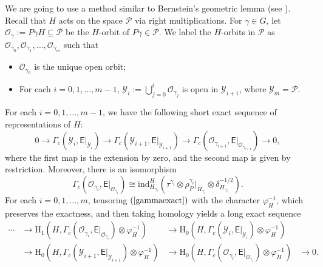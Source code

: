\documentclass[12pt]{amsart}
\newcommand{\CP}{{\mathcal {P}}}
\newcommand{\RH}{{\mathrm {H}}}
\theoremstyle{Theorem}
\theoremstyle{Theorem}
\theoremstyle{Theorem}
\theoremstyle{Theorem}
\theoremstyle{Plain}
\theoremstyle{remark}
\theoremstyle{remark}
\theoremstyle{Definition}
\begin{document}
We are going to use a method similar to Bernstein's geometric lemma (see \cite{B-Z}). Recall that $H$ acts on the space $\mathcal{P}$ via right multiplications. For $\gamma\in G$, let $ \mathcal{O}_\gamma := P \gamma H \subseteq \CP $ be the $H$-orbit of $ P \gamma \in \CP$.  We label the $H$-orbits in $\mathcal{P}$ as $ \mathcal{O}_{ \gamma_0 }, \mathcal{O}_{ \gamma_1 }, \dots, \mathcal{O}_{ \gamma_m } $ such that
\begin{itemize}
    \item $ \mathcal{O}_{\gamma_0} $ is the unique open orbit;
    \item For each $ i = 0, 1, \dots, m - 1 $, $\mathcal{Y}_i := \bigcup_{j=0}^i \mathcal{O}_{ \gamma_j } $ is open in $ \mathcal{Y}_{i+1} $, where $ \mathcal{Y}_m = \mathcal{P} $.
\end{itemize}
For each $ i = 0, 1, \dots, m - 1 $, we have the following short exact sequence of representations of $H$:
\begin{equation}
    \label{gammaexact}
    0 \rightarrow \Gamma_c \left( \mathcal{Y}_{i}, \mathsf{E}|_{ \mathcal{Y}_{i} } \right) \to \Gamma_c \left( \mathcal{Y}_{i + 1}, \mathsf{E}|_{ \mathcal{Y}_{i + 1} } \right) \to \Gamma_c \left( \mathcal{O}_{ \gamma_{i + 1} }, \mathsf{E}|_{ \mathcal{O}_{ \gamma_{i + 1} } } \right) \rightarrow 0,
\end{equation}
where the first map is the extension by zero, and the second map is given by restriction. Moreover, there is an isomorphism
\begin{equation}
    \label{littleorbitsections}
    \Gamma_c \left( \mathcal{O}_{ \gamma_{i} }, \mathsf{E}|_{ \mathcal{O}_{ \gamma_{i} } } \right) \cong \mathrm{ind}^H_{ H_{ \gamma_i } } \left( \tau^{ \gamma_i } \otimes \rho_P^{ \gamma_i }|_{ H_{ \gamma_i } } \otimes \delta_{ H_{ \gamma_i } }^{-1/2} \right).
\end{equation}
For each $ i = 0, 1, \dots, m $, tensoring $ ( \ref{gammaexact} ) $ with the character $ \varphi_H^{-1} $, which preserves the exactness, and then taking homology yields a long exact sequence 
\begin{equation}
    \label{longexact}
    \begin{array}{llll}
        \cdots &\rightarrow \RH_1
        \left(
            H, \Gamma_c \left( \mathcal{O}_{ \gamma_{i} }, \mathsf{E}|_{ \mathcal{O}_{ \gamma_{i} } } \right) \otimes \varphi_H^{-1}
        \right) 
        &\rightarrow \RH_0
        \left(
            H, \Gamma_c \left( \mathcal{Y}_{i}, \mathsf{E}|_{ \mathcal{Y}_{i} } \right) \otimes \varphi_H^{-1}
        \right)
        &\\
        &\rightarrow \RH_0 
        \left(
            H, \Gamma_c \left( \mathcal{Y}_{i + 1}, \mathsf{E}|_{ \mathcal{Y}_{i + 1} } \right) \otimes \varphi_H^{-1}
        \right)
        &\rightarrow \RH_0
        \left(
            H, \Gamma_c \left( \mathcal{O}_{ \gamma_{i} }, \mathsf{E}|_{ \mathcal{O}_{ \gamma_{i} } } \right) \otimes \varphi_H^{-1}
        \right)
        &\rightarrow 0.
    \end{array}
\end{equation}
\end{document}
